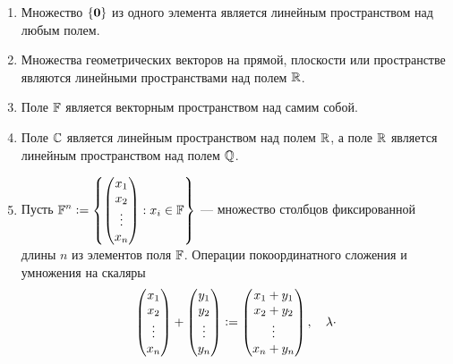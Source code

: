 \begin{example}
    \begin{enumerate}
        \item Множество $\{\boldsymbol{0}\}$ из одного элемента является линейным пространством над любым полем.
        \item Множества геометрических векторов на прямой, плоскости или пространстве являются линейными пространствами над полем $\mathbb{R}$.
        \item Поле $\mathbb{F}$ является векторным пространством над самим собой.
        \item Поле $\mathbb{C}$ является линейным пространством над полем $\mathbb{R}$, а поле $\mathbb{R}$ является линейным пространством над полем $\mathbb{Q}$.
        \item Пусть
            $\displaystyle
                \mathbb{F}^n \vcentcolon =
                \left\{
                    \begin{pmatrix}
                        x_1\\
                        x_2\\
                        \vdots\\
                        x_n
                    \end{pmatrix} : x_i \in \mathbb{F}
                \right\}
            $
            --- множество столбцов фиксированной длины $n$ из элементов поля $\mathbb{F}$. Операции покоординатного сложения и умножения на скаляры
            \[
                \begin{pmatrix}
                    x_1\\
                    x_2\\
                    \vdots\\
                    x_n
                \end{pmatrix} +
                \begin{pmatrix}
                    y_1\\
                    y_2\\
                    \vdots\\
                    y_n
                \end{pmatrix} \vcentcolon=
                \begin{pmatrix}
                    x_1 + y_1\\
                    x_2 + y_2\\
                    \vdots\\
                    x_n + y_n
                \end{pmatrix},\quad
                \lambda\cdot
\]
\end{enumerate}
\end{example}
